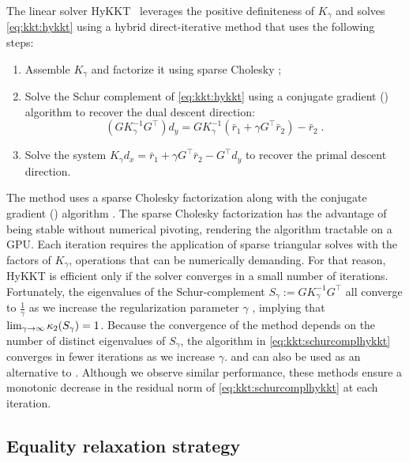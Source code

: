 The linear solver HyKKT~\cite{regev2023hykkt}
leverages the positive definiteness of $K_\gamma$ and solves
\eqref{eq:kkt:hykkt} using a hybrid direct-iterative method
that uses the following steps:
\begin{enumerate}
  \item Assemble $K_\gamma$ and factorize it using sparse Cholesky ;
  \item Solve the Schur complement of \eqref{eq:kkt:hykkt} using a conjugate gradient (\CG)
    algorithm to recover the dual descent direction:
    \begin{equation}
      \label{eq:kkt:schurcomplhykkt}
      (G K_\gamma^{-1} G^\top) d_y = G K_\gamma^{-1} (\bar{r}_1 + \gamma G^\top \bar{r}_2) - \bar{r}_2 \; .
    \end{equation}
  \item Solve the system $K_\gamma d_x = \bar{r}_1 + \gamma G^\top \bar{r}_2 - G^\top d_y$
    to recover the primal descent direction.
\end{enumerate}
The method uses a sparse Cholesky factorization along with the conjugate gradient (\CG) algorithm \cite{hestenes-stiefel-1952}.
The sparse Cholesky factorization has the advantage of being stable without
numerical pivoting, rendering the algorithm tractable on a GPU.
Each \CG iteration requires the application of sparse triangular solves with the
factors of $K_\gamma$, operations that can be numerically demanding. For that reason,
HyKKT is efficient only if the \CG solver converges in a small number of iterations.
Fortunately, the eigenvalues of the Schur-complement $S_\gamma := G K_\gamma^{-1} G^\top$
all converge to $\frac{1}{\gamma}$ as we increase the regularization parameter
$\gamma$ \cite[Theorem 4]{regev2023hykkt}, implying that $\lim_{\gamma \to \infty} \kappa_2(S_\gamma) = 1$.
Because the convergence of the \CG method depends on the number of distinct eigenvalues of $S_{\gamma}$,
the \CG algorithm in \eqref{eq:kkt:schurcomplhykkt} converges in fewer iterations
as we increase $\gamma$.
\CR \cite{hestenes-stiefel-1952} and \CAR \cite{montoison-orban-saunders-2023} can also be used as an alternative to \CG.
Although we observe similar performance, these methods ensure a monotonic decrease in the residual norm of \eqref{eq:kkt:schurcomplhykkt} at each iteration.

\subsection{Equality relaxation strategy}
\label{sec:kkt:sckkt}

